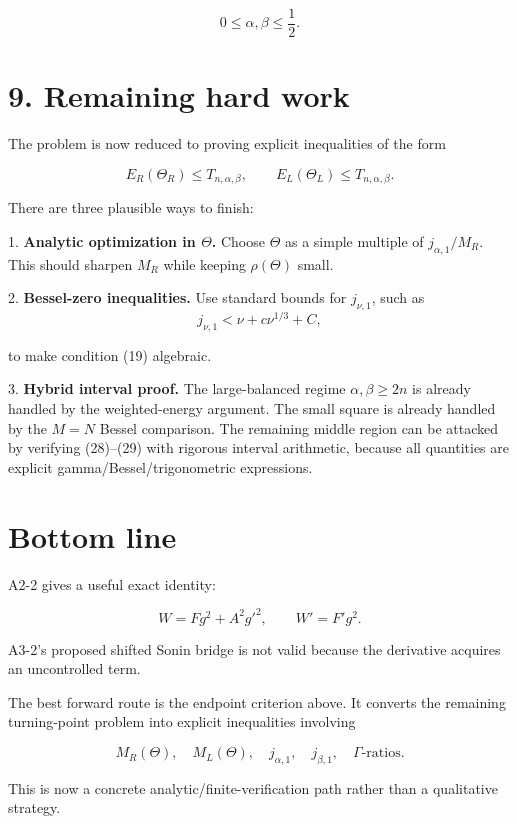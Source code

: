 \documentclass[11pt]{article}
\begin{document}
\begin{equation*}
0\le\alpha,\beta\le\frac12.
\end{equation*}




\section*{9. Remaining hard work}

The problem is now reduced to proving explicit inequalities of the form

\begin{equation*}
E_R(\Theta_R)\le T_{n,\alpha,\beta},
\qquad
E_L(\Theta_L)\le T_{n,\alpha,\beta}.
\end{equation*}


There are three plausible ways to finish:

1. \textbf{Analytic optimization in \(\Theta\).}
   Choose \(\Theta\) as a simple multiple of \(j_{\alpha,1}/M_R\). This should sharpen \(M_R\) while keeping \(\rho(\Theta)\) small.

2. \textbf{Bessel-zero inequalities.}
   Use standard bounds for \(j_{\nu,1}\), such as
\begin{equation*}
j_{\nu,1}<\nu+c\nu^{1/3}+C,
\end{equation*}

   to make condition (19) algebraic.

3. \textbf{Hybrid interval proof.}
   The large-balanced regime \(\alpha,\beta\ge2n\) is already handled by the weighted-energy argument. The small square is already handled by the \(M=N\) Bessel comparison. The remaining middle region can be attacked by verifying (28)--(29) with rigorous interval arithmetic, because all quantities are explicit gamma/Bessel/trigonometric expressions.



\section*{Bottom line}

A2-2 gives a useful exact identity:

\begin{equation*}
\boxed{
W=F g^2+A^2g'^2,\qquad W'=F'g^2.
}
\end{equation*}


A3-2's proposed shifted Sonin bridge is not valid because the derivative acquires an uncontrolled term.

The best forward route is the endpoint criterion above. It converts the remaining turning-point problem into explicit inequalities involving

\begin{equation*}
M_R(\Theta),\quad M_L(\Theta),\quad j_{\alpha,1},\quad j_{\beta,1},
\quad
\Gamma\text{-ratios}.
\end{equation*}


This is now a concrete analytic/finite-verification path rather than a qualitative strategy.
\end{document}
